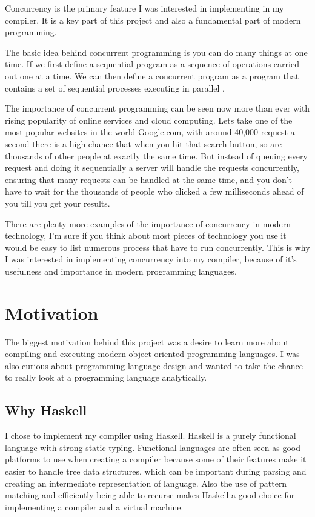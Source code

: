 Concurrency is the primary feature I was interested in implementing in my compiler. It is a key part of this project and also a fundamental part of modern programming. 

The basic idea behind concurrent programming is you can do many things at one time. If we first define a sequential program as a sequence of operations carried out one at a time. We can then define a concurrent program as a program that contains a set of sequential processes executing in parallel \cite[p.~414]{CompGen1997}.

The importance of concurrent programming can be seen now more than ever with rising popularity of online services and cloud computing. Lets take one of the most popular websites in the world Google.com, with around 40,000 request a second there is a high chance that when you hit that search button, so are thousands of other people at exactly the same time. But instead of queuing every request and doing it sequentially a server will handle the requests concurrently, ensuring that many requests can be handled at the same time, and you don't have to wait for the thousands of people who clicked a few milliseconds ahead of you till you get your results.

There are plenty more examples of the importance of concurrency in modern technology, I'm sure if you think about most pieces of technology you use it would be easy to list numerous process that have to run concurrently. This is why I was interested in implementing concurrency into my compiler, because of it's usefulness and importance in modern programming languages.   


\section{Motivation}

The biggest motivation behind this project was a desire to learn more about compiling and executing modern object oriented programming languages. I was also curious about programming language design and wanted to take the chance to really look at a programming language analytically.

\subsection{Why Haskell}

I chose to implement my compiler using Haskell. Haskell is a purely functional language with strong static typing. Functional languages are often seen as good platforms to use when creating a compiler because some of their features make it easier to handle tree data structures, which can be important during parsing and creating an intermediate representation of language. Also the use of pattern matching and efficiently being able to recurse makes Haskell a good choice for implementing a compiler and a virtual machine.


